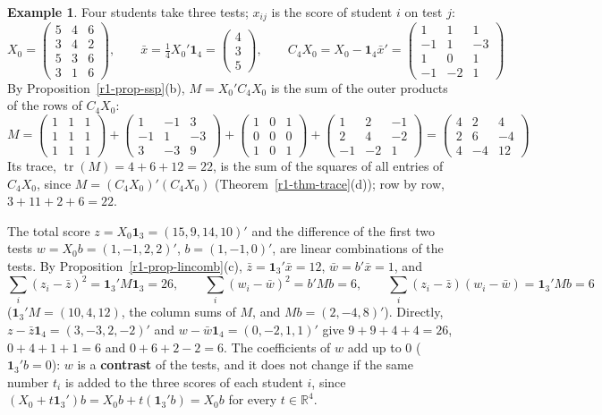 \documentclass[12pt]{article}
\newcommand{\R}{\mathbb R}
\newcommand{\one}{\mathbf 1}
\DeclareMathOperator{\tr}{tr}
\theoremstyle{definition}
\newtheorem{example}[theorem]{Example}
\begin{document}
\begin{example}\label{r1-exm-lincomb}
Four students take three tests; \(x_{ij}\) is the score of student \(i\) on test \(j\):
\[
X_0=\begin{pmatrix}5&4&6\\3&4&2\\5&3&6\\3&1&6\end{pmatrix},\qquad
\bar x=\tfrac14X_0'\one_4=\begin{pmatrix}4\\3\\5\end{pmatrix},\qquad
C_4X_0=X_0-\one_4\bar x'=\begin{pmatrix}1&1&1\\-1&1&-3\\1&0&1\\-1&-2&1\end{pmatrix}
\]
By Proposition~\ref{r1-prop-ssp}(b), \(M=X_0'C_4X_0\) is the sum of the outer products of the rows of \(C_4X_0\):
\[
M=\begin{pmatrix}1&1&1\\1&1&1\\1&1&1\end{pmatrix}+\begin{pmatrix}1&-1&3\\-1&1&-3\\3&-3&9\end{pmatrix}
+\begin{pmatrix}1&0&1\\0&0&0\\1&0&1\end{pmatrix}+\begin{pmatrix}1&2&-1\\2&4&-2\\-1&-2&1\end{pmatrix}
=\begin{pmatrix}4&2&4\\2&6&-4\\4&-4&12\end{pmatrix}
\]
Its trace, \(\tr(M)=4+6+12=22\), is the sum of the squares of all entries of \(C_4X_0\), since
\(M=(C_4X_0)'(C_4X_0)\) (Theorem~\ref{r1-thm-trace}(d)); row by row, \(3+11+2+6=22\).

The total score \(z=X_0\one_3=(15,9,14,10)'\) and the difference of the first two tests
\(w=X_0b=(1,-1,2,2)'\), \(b=(1,-1,0)'\), are linear combinations of the tests. By
Proposition~\ref{r1-prop-lincomb}(c), \(\bar z=\one_3'\bar x=12\), \(\bar w=b'\bar x=1\), and
\[
\sum_i(z_i-\bar z)^2=\one_3'M\one_3=26,\qquad \sum_i(w_i-\bar w)^2=b'Mb=6,\qquad
\sum_i(z_i-\bar z)(w_i-\bar w)=\one_3'Mb=6
\]
(\(\one_3'M=(10,4,12)\), the column sums of \(M\), and \(Mb=(2,-4,8)'\)). Directly,
\(z-\bar z\one_4=(3,-3,2,-2)'\) and \(w-\bar w\one_4=(0,-2,1,1)'\) give \(9+9+4+4=26\), \(0+4+1+1=6\) and
\(0+6+2-2=6\). The coefficients of \(w\) add up to \(0\) (\(\one_3'b=0\)): \(w\) is a \textbf{contrast} of the tests,
and it does not change if the same number \(t_i\) is added to the three scores of each student \(i\), since
\((X_0+t\one_3')b=X_0b+t(\one_3'b)=X_0b\) for every \(t\in\R^4\).
\end{example}
\end{document}
